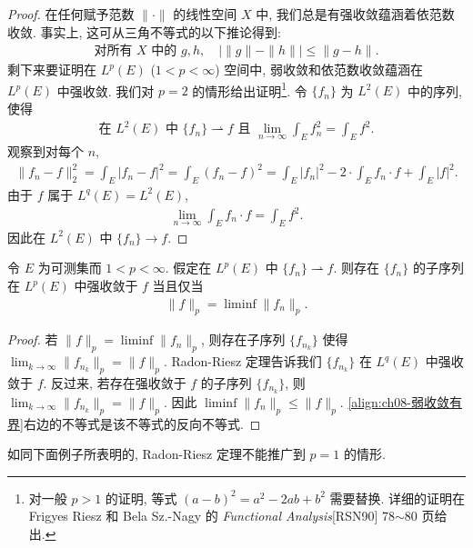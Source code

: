 \documentclass[../../main.tex]{subfiles}
\begin{document}
\begin{proof}
在任何赋予范数 $\|\cdot\|$ 的线性空间 $X$ 中, 我们总是有强收敛蕴涵着依范数收敛. 事实上, 这可从三角不等式的以下推论得到:
\begin{align*}
\text{对所有 }X\text{ 中的 }g,h,\quad|\|g\|-\|h\||\leqslant\|g-h\|.
\end{align*}
剩下来要证明在 $L^{p}(E)$ ($1<p<\infty$) 空间中, 弱收敛和依范数收敛蕴涵在 $L^{p}(E)$ 中强收敛. 我们对 $p=2$ 的情形给出证明\footnote{对一般 $p>1$ 的证明, 等式 $(a-b)^{2}=a^{2}-2ab+b^{2}$ 需要替换. 详细的证明在 Frigyes Riesz 和 Bela Sz.-Nagy 的 \emph{Functional Analysis}[RSN90] 78$\sim$80 页给出.}. 令 $\{f_{n}\}$ 为 $L^{2}(E)$ 中的序列, 使得
\begin{align*}
\text{在 }L^{2}(E)\text{ 中 }\{f_{n}\}\rightharpoonup f\text{ 且 }\lim_{n\to\infty}\int_{E}f_{n}^{2}=\int_{E}f^{2}.
\end{align*}
观察到对每个 $n$,
\begin{align*}
\|f_{n}-f\|_{2}^{2}=\int_{E}|f_{n}-f|^{2}=\int_{E}(f_{n}-f)^{2}=\int_{E}|f_{n}|^{2}-2\cdot\int_{E}f_{n}\cdot f+\int_{E}|f|^{2}.
\end{align*}
由于 $f$ 属于 $L^{q}(E)=L^{2}(E)$,
\begin{align*}
\lim_{n\to\infty}\int_{E}f_{n}\cdot f=\int_{E}f^{2}.
\end{align*}
因此在 $L^{2}(E)$ 中 $\{f_{n}\}\to f$.
\end{proof}

\begin{corollary}\label{corollary:ch08-弱收敛子列强收敛}
令 $E$ 为可测集而 $1<p<\infty$. 假定在 $L^{p}(E)$ 中 $\{f_{n}\}\rightharpoonup f$. 则存在 $\{f_{n}\}$ 的子序列在 $L^{p}(E)$ 中强收敛于 $f$ 当且仅当
\begin{align*}
\|f\|_{p}=\liminf\|f_{n}\|_{p}.
\end{align*}
\end{corollary}

\begin{proof}
若 $\|f\|_{p}=\liminf\|f_{n}\|_{p}$, 则存在子序列 $\{f_{n_{k}}\}$ 使得 $\lim_{k\to\infty}\|f_{n_{k}}\|_{p}=\|f\|_{p}$. Radon-Riesz 定理告诉我们 $\{f_{n_{k}}\}$ 在 $L^{q}(E)$ 中强收敛于 $f$. 反过来, 若存在强收敛于 $f$ 的子序列 $\{f_{n_{k}}\}$, 则 $\lim_{k\to\infty}\|f_{n_{k}}\|_{p}=\|f\|_{p}$. 因此 $\liminf\|f_{n}\|_{p}\leqslant\|f\|_{p}$. \eqref{align:ch08-弱收敛有界}右边的不等式是该不等式的反向不等式.
\end{proof}

如同下面例子所表明的, Radon-Riesz 定理不能推广到 $p=1$ 的情形.
\end{document}
